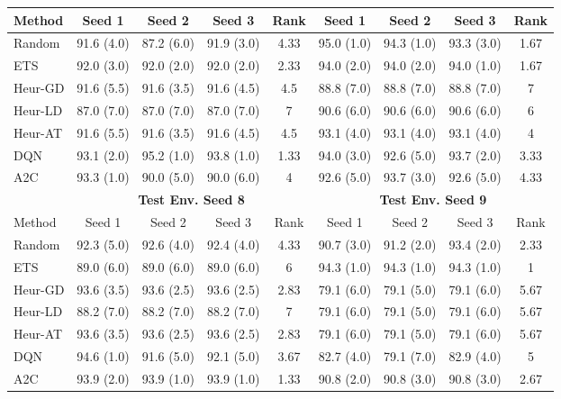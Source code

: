 \begin{table}[t]
{\begin{tabular}{lcccccccc}
\cmidrule(lr){2-5} \cmidrule(lr){6-9} 
Method    & Seed 1      & Seed 2      & Seed 3     & Rank & Seed 1      & Seed 2      & Seed 3     & Rank \\ \midrule
Random    & 91.6 (4.0)  & 87.2 (6.0)  & 91.9 (3.0) & 4.33 & 95.0 (1.0)  & 94.3 (1.0)  & 93.3 (3.0) & 1.67 \\
ETS       & 92.0 (3.0)  & 92.0 (2.0)  & 92.0 (2.0) & 2.33 & 94.0 (2.0)  & 94.0 (2.0)  & 94.0 (1.0) & 1.67 \\
Heur-GD   & 91.6 (5.5)  & 91.6 (3.5)  & 91.6 (4.5) & 4.5  & 88.8 (7.0)  & 88.8 (7.0)  & 88.8 (7.0) & 7    \\
Heur-LD   & 87.0 (7.0)  & 87.0 (7.0)  & 87.0 (7.0) & 7    & 90.6 (6.0)  & 90.6 (6.0)  & 90.6 (6.0) & 6    \\
Heur-AT   & 91.6 (5.5)  & 91.6 (3.5)  & 91.6 (4.5) & 4.5  & 93.1 (4.0)  & 93.1 (4.0)  & 93.1 (4.0) & 4    \\
DQN       & 93.1 (2.0)  & 95.2 (1.0)  & 93.8 (1.0) & 1.33 & 94.0 (3.0)  & 92.6 (5.0)  & 93.7 (2.0) & 3.33 \\
A2C       & 93.3 (1.0)  & 90.0 (5.0)  & 90.0 (6.0) & 4    & 92.6 (5.0)  & 93.7 (3.0)  & 92.6 (5.0) & 4.33 \\ \midrule
\textbf{} & \multicolumn{4}{c}{\textbf{Test Env. Seed 8}} & \multicolumn{4}{c}{\textbf{Test Env. Seed 9}} \\
\cmidrule(lr){2-5} \cmidrule(lr){6-9} 
Method    & Seed 1      & Seed 2      & Seed 3     & Rank & Seed 1      & Seed 2      & Seed 3     & Rank \\ \midrule
Random    & 92.3 (5.0)  & 92.6 (4.0)  & 92.4 (4.0) & 4.33 & 90.7 (3.0)  & 91.2 (2.0)  & 93.4 (2.0) & 2.33 \\
ETS       & 89.0 (6.0)  & 89.0 (6.0)  & 89.0 (6.0) & 6    & 94.3 (1.0)  & 94.3 (1.0)  & 94.3 (1.0) & 1    \\
Heur-GD   & 93.6 (3.5)  & 93.6 (2.5)  & 93.6 (2.5) & 2.83 & 79.1 (6.0)  & 79.1 (5.0)  & 79.1 (6.0) & 5.67 \\
Heur-LD   & 88.2 (7.0)  & 88.2 (7.0)  & 88.2 (7.0) & 7    & 79.1 (6.0)  & 79.1 (5.0)  & 79.1 (6.0) & 5.67 \\
Heur-AT   & 93.6 (3.5)  & 93.6 (2.5)  & 93.6 (2.5) & 2.83 & 79.1 (6.0)  & 79.1 (5.0)  & 79.1 (6.0) & 5.67 \\
DQN       & 94.6 (1.0)  & 91.6 (5.0)  & 92.1 (5.0) & 3.67 & 82.7 (4.0)  & 79.1 (7.0)  & 82.9 (4.0) & 5    \\
A2C       & 93.9 (2.0)  & 93.9 (1.0)  & 93.9 (1.0) & 1.33 & 90.8 (2.0)  & 90.8 (3.0)  & 90.8 (3.0) & 2.67 \\
\bottomrule
\end{tabular}
}
\end{table}